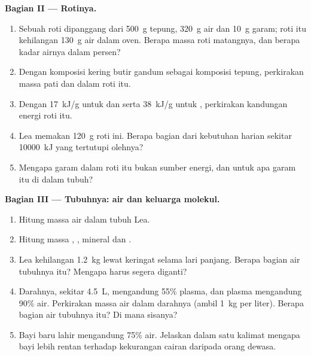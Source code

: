 \begin{problem}
\medskip
\noindent\textbf{Bagian II --- Rotinya.}
\begin{enumerate}[resume]
  \item Sebuah roti dipanggang dari \qty{500}{g} tepung, \qty{320}{g}
        air dan \qty{10}{g} garam; roti itu kehilangan \qty{130}{g} air
        dalam oven. Berapa massa roti matangnya, dan berapa kadar
        airnya dalam persen?
  \item Dengan komposisi kering butir gandum sebagai komposisi tepung,
        perkirakan massa pati dan  dalam roti itu.
  \item Dengan \qty{17}{kJ/g} untuk  dan  serta
        \qty{38}{kJ/g} untuk , perkirakan kandungan energi roti
        itu.
  \item Lea memakan \qty{120}{g} roti ini. Berapa bagian dari kebutuhan
        harian sekitar \qty{10000}{kJ} yang tertutupi olehnya?
  \item Mengapa garam dalam roti itu bukan sumber energi, dan untuk apa
        garam itu di dalam tubuh?
\end{enumerate}

\medskip
\noindent\textbf{Bagian III --- Tubuhnya: air dan keluarga molekul.}
\begin{enumerate}[resume]
  \item Hitung massa air dalam tubuh Lea.
  \item Hitung massa , , mineral dan .
  \item Lea kehilangan \qty{1.2}{kg} lewat keringat selama lari
        panjang. Berapa bagian air tubuhnya itu? Mengapa harus segera
        diganti?
  \item Darahnya, sekitar \qty{4.5}{L}, mengandung 55\% plasma, dan
        plasma mengandung 90\% air. Perkirakan massa air dalam darahnya
        (ambil \qty{1}{kg} per liter). Berapa bagian air tubuhnya itu?
        Di mana sisanya?
  \item Bayi baru lahir mengandung 75\% air. Jelaskan dalam satu
        kalimat mengapa bayi lebih rentan terhadap kekurangan cairan
        daripada orang dewasa.
\end{enumerate}


\end{problem}
